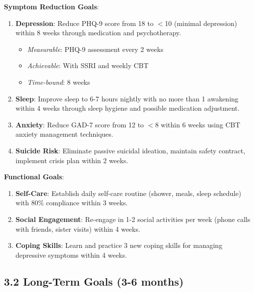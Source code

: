 \documentclass[11pt,letterpaper]{article}
\begin{document}
\textbf{Symptom Reduction Goals}:
\begin{enumerate}[leftmargin=*]
    \item \textbf{Depression}: Reduce PHQ-9 score from 18 to $<$10 (minimal depression) within 8 weeks through medication and psychotherapy.
    \begin{itemize}
        \item \textit{Measurable}: PHQ-9 assessment every 2 weeks
        \item \textit{Achievable}: With SSRI and weekly CBT
        \item \textit{Time-bound}: 8 weeks
    \end{itemize}

    \item \textbf{Sleep}: Improve sleep to 6-7 hours nightly with no more than 1 awakening within 4 weeks through sleep hygiene and possible medication adjustment.

    \item \textbf{Anxiety}: Reduce GAD-7 score from 12 to $<$8 within 6 weeks using CBT anxiety management techniques.

    \item \textbf{Suicide Risk}: Eliminate passive suicidal ideation, maintain safety contract, implement crisis plan within 2 weeks.
\end{enumerate}

\textbf{Functional Goals}:
\begin{enumerate}[leftmargin=*]
    \item \textbf{Self-Care}: Establish daily self-care routine (shower, meals, sleep schedule) with 80\% compliance within 3 weeks.

    \item \textbf{Social Engagement}: Re-engage in 1-2 social activities per week (phone calls with friends, sister visits) within 4 weeks.

    \item \textbf{Coping Skills}: Learn and practice 3 new coping skills for managing depressive symptoms within 4 weeks.
\end{enumerate}

\subsection*{3.2 Long-Term Goals (3-6 months)}
\end{document}
